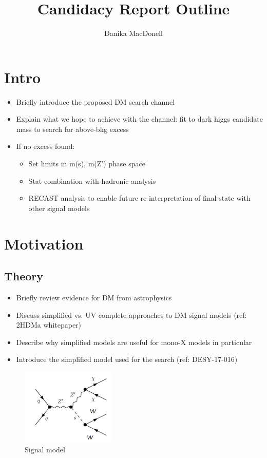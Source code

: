 \documentclass[12pt]{article}
\author{Danika MacDonell}
\title{Candidacy Report Outline}
\begin{document}
\maketitle

\section{Intro}
\begin{itemize}
\item Briefly introduce the proposed DM search channel
\item Explain what we hope to achieve with the channel: fit to dark higgs candidate mass to search for above-bkg excess
\item If no excess found:
\begin{itemize}
	\item Set limits in m(s), m(Z') phase space
	\item Stat combination with hadronic analysis 
	\item RECAST analysis to enable future re-interpretation of final state with other signal models
\end{itemize}
\end{itemize}
\section{Motivation}
\subsection{Theory}
\begin{itemize}
\item Briefly review evidence for DM from astrophysics
\item Discuss simplified vs. UV complete approaches to DM signal models (ref: 2HDMa whitepaper)
\item Describe why simplified models are useful for mono-X models in particular
\item Introduce the simplified model used for the search (ref: DESY-17-016)
\end{itemize}
\begin{figure}[H]
	\centering
	\includegraphics[width=0.4\textwidth]{figures/Signal.png}
	\caption{Signal model}
	\label{fig:signal}
\end{figure}
\end{document}
